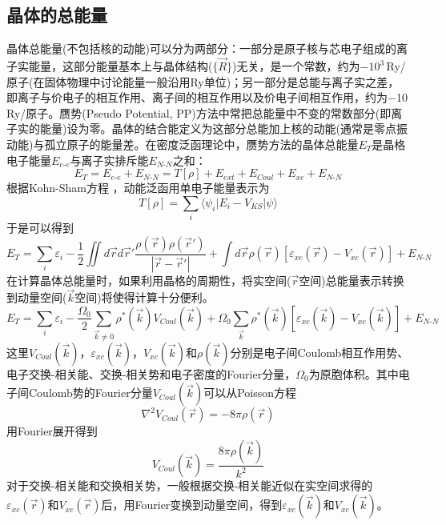 \subsection{晶体的总能量}
晶体总能量(不包括核的动能)可以分为两部分：一部分是原子核与芯电子组成的离子实能量，这部分能量基本上与晶体结构($\{\vec R\}$)无关，是一个常数，约为$-$$10^3$\,Ry/原子(在固体物理中讨论能量一般沿用Ry单位)；另一部分是总能与离子实之差，即离子与价电子的相互作用、离子间的相互作用以及价电子间相互作用，约为$-$10\,Ry/原子。赝势(Pseudo Potential, PP)方法中常把总能量中不变的常数部分(即离子实的能量)设为零。晶体的结合能定义为这部分总能加上核的动能(通常是零点振动能)与孤立原子的能量差。在密度泛函理论中，赝势方法的晶体总能量$E_T$是晶格电子能量$E_{e\textrm{-}e}$与离子实排斥能$E_{N\textrm{-}N}$之和：
\begin{equation}
  E_T=E_{e\textrm{-}e}+E_{N\textrm{-}N}=T[\rho]+E_{ext}+E_{Coul}+E_{xc}+E_{N\textrm{-}N}
  \label{eq:solid-total}
\end{equation}
根据Kohn-Sham方程%
，动能泛函用单电子能量表示为
\begin{equation}
  T[\rho]=\sum_i\langle\psi_i|E_i-V_{KS}|\psi\rangle
  \label{eq:solid-49}
\end{equation}
于是可以得到
\begin{equation}
  E_T=\sum_i\varepsilon_i-\frac12\iint d\vec rd\vec r'\dfrac{\rho(\vec r)\rho(\vec r')}{|\vec r-\vec r'|}+\int d\vec r\rho(\vec r)[\varepsilon_{xc}(\vec r)-V_{xc}(\vec r)]+E_{N\textrm{-}N}
  \label{eq:solid-50}
\end{equation}
在计算晶体总能量时，如果利用晶格的周期性，将实空间($\vec r$空间)总能量表示转换到动量空间($\vec k$空间)将使得计算十分便利。
\begin{equation}
  E_T=\sum_i\varepsilon_i-\frac{\Omega_0}2\sum_{\vec k\neq0}\rho^{\ast}(\vec k)V_{Coul}(\vec k)+\Omega_0\sum_{\vec k}\rho^{\ast}(\vec k)[\varepsilon_{xc}(\vec k)-V_{xc}(\vec k)]+E_{N\textrm{-}N}
  \label{eq:solid-51}
\end{equation}
这里$V_{Coul}(\vec k)$，$\varepsilon_{xc}(\vec k)$，$V_{xc}(\vec k)$和$\rho(\vec k)$分别是电子间Coulomb相互作用势、电子交换-相关能、交换-相关势和电子密度的Fourier分量，$\Omega_0$为原胞体积。其中电子间Coulomb势的Fourier分量$V_{Coul}(\vec k)$可以从Poisson方程
\begin{equation}
  \nabla^2V_{Coul}(\vec r)=-8\pi\rho(\vec r)
  \label{eq:poisson-r}
\end{equation}
用Fourier展开得到
\begin{equation}
  V_{Coul}(\vec k)=\dfrac{8\pi\rho(\vec k)}{k^2}
  \label{eq:poisson-k}
\end{equation}
对于交换-相关能和交换相关势，一般根据交换-相关能近似在实空间求得的$\varepsilon_{xc}(\vec r)$和$V_{xc}(\vec r)$后，用Fourier变换到动量空间，得到$\varepsilon_{xc}(\vec k)$和$V_{xc}(\vec k)$。

